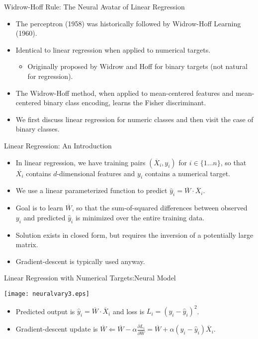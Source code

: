 \begin{frame}{Widrow-Hoff Rule: The Neural Avatar of Linear
Regression}
\begin{itemize}
\item  The perceptron (1958) was historically followed by  Widrow-Hoff
Learning (1960).
\item Identical to linear regression when applied to
numerical targets.
\begin{itemize}
\item  Originally proposed by Widrow and Hoff for binary targets (not natural for regression).
\end{itemize}
\item The Widrow-Hoff method, when applied to
mean-centered features and mean-centered binary class encoding,
learns the   Fisher discriminant.
\item We first discuss linear regression for numeric classes and
then visit the case of binary classes.
\end{itemize}
\end{frame}


\begin{frame}{Linear Regression: An Introduction}
\begin{itemize}
\item In linear regression, we have training pairs $(\overline{X}_i,
y_i)$ for $i \in \{ 1 \ldots n \}$, so that $\overline{X_i}$
contains $d$-dimensional features and $y_i$ contains a numerical
target.
\item We use a linear parameterized function to  predict $\hat{y}_i= \overline{W} \cdot
\overline{X}_i$.
\item Goal is to  learn $\overline{W}$, so that the sum-of-squared differences
between observed  $y_i$ and predicted $\hat{y}_i$ is minimized over
the entire training data.
\item Solution exists in closed form, but requires the inversion of a potentially large
matrix. \item  Gradient-descent is typically used anyway.
\end{itemize}
\end{frame}


\begin{frame}{Linear Regression with Numerical Targets:Neural Model}
\begin{center}
\texttt{[image: neuralvary3.eps]}
\end{center}
\begin{itemize}
\item Predicted output is $\hat{y}_i= \overline{W}\cdot \overline{X}_i$ and loss is $L_i=(y_i -\hat{y}_i)^2$.
\item  Gradient-descent update is $\overline{W} \Leftarrow
\overline{W} - \alpha \frac{\partial L_i}{\partial \overline{W}} =
\overline{W}+ \alpha (y_i - \hat{y}_i) \overline{X}_i$.
\end{itemize}
\end{frame}


